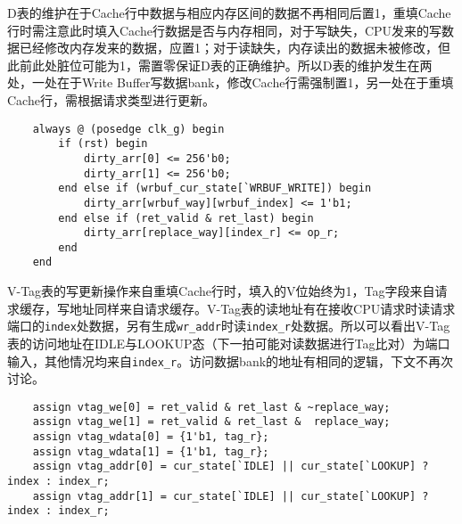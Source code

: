 \documentclass[UTF-8,twoside,c5size]{ctexart}
\begin{document}
    D表的维护在于Cache行中数据与相应内存区间的数据不再相同后置1，重填Cache行时需注意此时填入Cache行数据是否与内存相同，对于写缺失，CPU发来的写数据已经修改内存发来的数据，应置1；对于读缺失，内存读出的数据未被修改，但此前此处脏位可能为1，需置零保证D表的正确维护。所以D表的维护发生在两处，一处在于Write Buffer写数据bank，修改Cache行需强制置1，另一处在于重填Cache行，需根据请求类型进行更新。
    \begin{verbatim}
    always @ (posedge clk_g) begin
        if (rst) begin
            dirty_arr[0] <= 256'b0;
            dirty_arr[1] <= 256'b0;
        end else if (wrbuf_cur_state[`WRBUF_WRITE]) begin
            dirty_arr[wrbuf_way][wrbuf_index] <= 1'b1;
        end else if (ret_valid & ret_last) begin
            dirty_arr[replace_way][index_r] <= op_r;
        end
    end
    \end{verbatim}

    V-Tag表的写更新操作来自重填Cache行时，填入的V位始终为1，Tag字段来自请求缓存，写地址同样来自请求缓存。V-Tag表的读地址有在接收CPU请求时读请求端口的\texttt{index}处数据，另有生成\texttt{wr\_addr}时读\texttt{index\_r}处数据。所以可以看出V-Tag表的访问地址在IDLE与LOOKUP态（下一拍可能对读数据进行Tag比对）为端口输入，其他情况均来自\texttt{index\_r}。访问数据bank的地址有相同的逻辑，下文不再次讨论。
    \begin{verbatim}
    assign vtag_we[0] = ret_valid & ret_last & ~replace_way;
    assign vtag_we[1] = ret_valid & ret_last &  replace_way;
    assign vtag_wdata[0] = {1'b1, tag_r};
    assign vtag_wdata[1] = {1'b1, tag_r};
    assign vtag_addr[0] = cur_state[`IDLE] || cur_state[`LOOKUP] ? index : index_r;
    assign vtag_addr[1] = cur_state[`IDLE] || cur_state[`LOOKUP] ? index : index_r;
    \end{verbatim}
    
\end{document}
